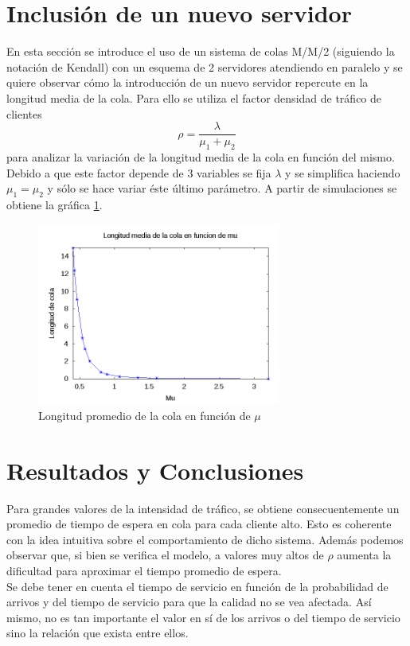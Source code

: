 \documentclass{sig-alternate}
\begin{document}
\section{Inclusi\'on de un nuevo servidor}
\label{sec:mm2}

En esta secci\'on se introduce el uso de un sistema de colas M/M/2 (siguiendo la notaci\'on de Kendall)
con un esquema de 2 servidores atendiendo en paralelo y se quiere observar c\'omo la introducci\'on
de un nuevo servidor repercute en la longitud media de la cola. Para ello se utiliza el factor densidad de tr\'afico de clientes
\begin{equation}
\rho = \frac{\lambda}{\mu_{1} + \mu_{2}}
\end{equation}
para analizar la variaci\'on de la longitud media de la cola en funci\'on del mismo.
Debido a que este factor depende de 3 variables se fija $\lambda$ y se simplifica haciendo
$\mu_{1}=\mu_{2}$ y s\'olo se hace variar \'este \'ultimo par\'ametro.
A partir de simulaciones se obtiene la gr\'afica \ref{fig:mu}.

\begin{figure}[ht]
\begin{center}
\includegraphics[width=8cm]{mm2-mu}
\caption{\label{fig:mu} Longitud promedio de la cola en funci\'on de $\mu$}
\end{center}
\end{figure}

\section{Resultados y Conclusiones}
\label{sec:conclusiones}
Para grandes valores de la intensidad de tráfico, se obtiene consecuentemente un promedio de tiempo de espera en cola para cada cliente alto.
Esto es coherente con la idea intuitiva sobre el comportamiento de dicho sistema. Además podemos observar que, si bien se verifica el modelo,
a valores muy altos de $\rho$ aumenta la dificultad para aproximar el tiempo promedio de espera.\\
Se debe tener en cuenta el tiempo de servicio en función de la probabilidad de arrivos y del tiempo de servicio para que la calidad no se vea afectada.
Así mismo, no es tan importante el valor en sí de los arrivos o del tiempo de servicio sino la relación que exista entre ellos.
\end{document}
